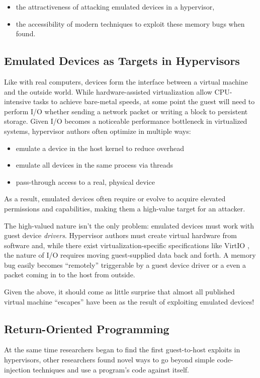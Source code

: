 \documentclass[conference]{IEEEtran}
\begin{document}
\begin{itemize}
\item the attractiveness of attacking emulated devices in a hypervisor,
\item the accessibility of modern techniques to exploit these memory
  bugs when found.
\end{itemize}

\vspace{3mm}
\subsection{Emulated Devices as Targets in Hypervisors}
Like with real computers, devices form the interface between a virtual
machine and the outside world. While hardware-assisted virtualization
allow CPU-intensive tasks to achieve bare-metal speeds, at some point
the guest will need to perform I/O whether sending a network packet or
writing a block to persistent storage. Given I/O becomes a noticeable
performance bottleneck in virtualized systems, hypervisor authors
often optimize in multiple ways:

\begin{itemize}
\item emulate a device in the host kernel to reduce overhead
\item emulate all devices in the same process via threads
\item pass-through access to a real, physical device
\end{itemize}

As a result, emulated devices often require or evolve to acquire
elevated permissions and capabilities, making them a high-value target
for an attacker.

The high-valued nature isn't the only problem: emulated devices must
work with guest device \emph{drivers}. Hypervisor authors must create
virtual hardware from software and, while there exist
virtualization-specific specifications like VirtIO \cite{b2}, the
nature of I/O requires moving guest-supplied data back and forth. A
memory bug easily becomes ``remotely'' triggerable by a guest device
driver or a even a packet coming in to the host from outside.

Given the above, it should come as little surprise that almost all
published virtual machine ``escapes'' \cite{b3} have been as the
result of exploiting emulated devices!

\vspace{3mm}
\subsection{Return-Oriented Programming}
At the same time researchers began to find the first guest-to-host
exploits in hypervisors, other researchers found novel ways to go
beyond simple code-injection techniques and use a program's code
against itself.
\end{document}
